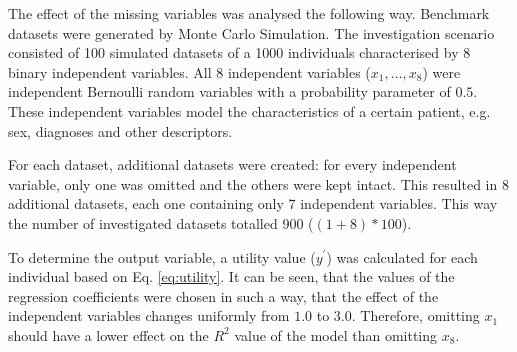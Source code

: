 								
							
	       The effect of the missing variables was analysed the following way. Benchmark datasets were generated by Monte Carlo Simulation. The investigation scenario consisted of 100 simulated datasets of a 1000 individuals characterised by 8 binary independent variables. All 8 independent variables ($x_1,\dots,x_8$) were independent Bernoulli random variables with a probability parameter of $0.5$. These independent variables model the characteristics of a certain patient, e.g. sex, diagnoses and other descriptors.
								
		For each dataset, additional datasets were created: for every independent variable, only one was omitted and the others were kept intact. This resulted in 8 additional datasets, each one containing only 7 independent variables. This way the number of investigated datasets totalled 900 ($(1+8)*100$).

								
		To determine the output variable, a utility value ($y^{'}$) was calculated for each individual based on Eq. \ref{eq:utility}. It can be seen, that the values of the regression coefficients were chosen in such a way, that the effect of the independent variables changes uniformly from $1.0$ to $3.0$. Therefore, omitting $x_1$ should have a lower effect on the $R^2$ value of the model than omitting $x_8$.
								
